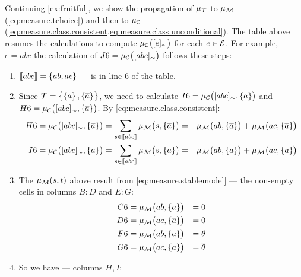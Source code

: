 \documentclass[x11names]{tlp}
\begin{document}
\begin{example}
		Continuing \cref{ex:fruitful}, we show the propagation of $\pwT$ to $\pwM$
		(\cref{eq:measure.tchoice}) and then to $\pwC$
		(\cref{eq:measure.class.consistent,eq:measure.class.unconditional}).
The
		table above resumes the calculations to compute $\pwc{\class{e}}$ for each $e
			\in \EVENTSset$.
For example, $e = abc$ the calculation of $J6 =
			\pwc{\class{abc}}$ follows these steps:
		\begin{enumerate}
			\item $\left\llbracket abc \right\rrbracket = \set{ab,ac}$ --- is in line $6$ of the table.
			\item Since $\TCHOICEset = \set{\set{a}, \set{\co{a}}}$, we need to calculate $I6 =
				      \pwc{\class{abc}, \set{a}}$ and $H6 = \pwc{\class{abc}, \set{\co{a}}}$.
By
			      \cref{eq:measure.class.consistent}:
			      \begin{equation*}
				      \begin{aligned}
					      H6 = \pwc{\class{abc}, \set{\co{a}}}
					       & = \sum_{s \in \stablecore{abc}} \pwm{s, \set{\co{a}}}
					      =
					       & \pwm{ab, \set{\co{a}}} +  \pwm{ac, \set{\co{a}}}      %
					      \\
					      I6 = \pwc{\class{abc}, \set{a}}
					       & = \sum_{s \in \stablecore{abc}} \pwm{s, \set{a}}
					      =
					       & \pwm{ab, \set{a}} +  \pwm{ac, \set{a}}
				      \end{aligned}
			      \end{equation*}
			\item The $\pwm{s,t}$ above result from \cref{eq:measure.stablemodel} --- the
			      non-empty cells in columns $B:D$ and $E:G$:
			      \begin{equation*}
				      \begin{aligned}
					      C6
					       & = \pwm{ab, \set{\co{a}}}
					       & = 0                      %
					      \\
					      D6
					       & = \pwm{ac, \set{\co{a}}}
					       & = 0                      %
					      \\
					      F6
					       & = \pwm{ab, \set{a}}
					       & = \theta                 %
					      \\
					      G6
					       & = \pwm{ac, \set{a}}
					       & = \co{\theta}
				      \end{aligned}
			      \end{equation*}
			\item So we have --- columns $H, I$:
			      \begin{equation*}

\end{equation*}
\end{enumerate}
\end{example}
\end{document}
